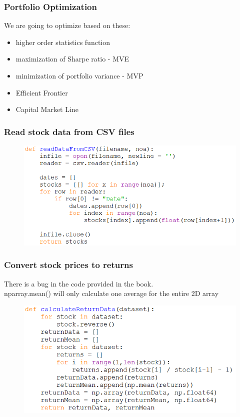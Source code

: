\documentclass{beamer}
\begin{document}
\begin{frame}
\frametitle{Portfolio Optimization}
We are going to optimize based on these:
\begin{itemize}
	\item higher order statistics function
	\item maximization of Sharpe ratio - MVE
	\item minimization of portfolio variance - MVP
	\item Efficient Frontier
	\item Capital Market Line
\end{itemize}
\end{frame}

\begin{frame}
\frametitle{Read stock data from CSV files}
\begin{figure}[H]
	\includegraphics[scale=0.55]{readDataFromCsv.png}
\end{figure}
\end{frame}

\begin{frame}
\frametitle{Convert stock prices to returns}
There is a bug in the code provided in the book. \\
nparray.mean() will only calculate one average for the entire 2D array
\begin{figure}[H]
	\includegraphics[scale=0.55]{calculate_return_data.png}
\end{figure}
\end{frame}
\end{document}
